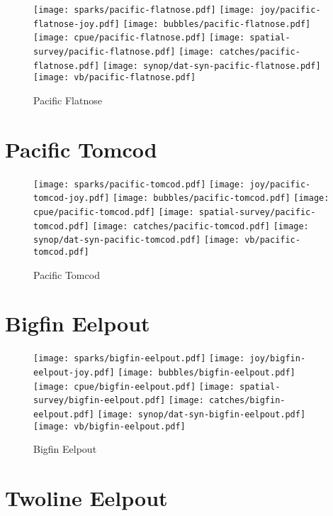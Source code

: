 \begin{figure}[htbp]
\centering
\texttt{[image: sparks/pacific-flatnose.pdf]}
\texttt{[image: joy/pacific-flatnose-joy.pdf]}
\texttt{[image: bubbles/pacific-flatnose.pdf]}
\texttt{[image: cpue/pacific-flatnose.pdf]}
\texttt{[image: spatial-survey/pacific-flatnose.pdf]}
\texttt{[image: catches/pacific-flatnose.pdf]}
\texttt{[image: synop/dat-syn-pacific-flatnose.pdf]}
\texttt{[image: vb/pacific-flatnose.pdf]}
\caption{Pacific Flatnose}
\end{figure}
\clearpage
\section{Pacific Tomcod}

\begin{figure}[htbp]
\centering
\texttt{[image: sparks/pacific-tomcod.pdf]}
\texttt{[image: joy/pacific-tomcod-joy.pdf]}
\texttt{[image: bubbles/pacific-tomcod.pdf]}
\texttt{[image: cpue/pacific-tomcod.pdf]}
\texttt{[image: spatial-survey/pacific-tomcod.pdf]}
\texttt{[image: catches/pacific-tomcod.pdf]}
\texttt{[image: synop/dat-syn-pacific-tomcod.pdf]}
\texttt{[image: vb/pacific-tomcod.pdf]}
\caption{Pacific Tomcod}
\end{figure}
\clearpage
\section{Bigfin Eelpout}

\begin{figure}[htbp]
\centering
\texttt{[image: sparks/bigfin-eelpout.pdf]}
\texttt{[image: joy/bigfin-eelpout-joy.pdf]}
\texttt{[image: bubbles/bigfin-eelpout.pdf]}
\texttt{[image: cpue/bigfin-eelpout.pdf]}
\texttt{[image: spatial-survey/bigfin-eelpout.pdf]}
\texttt{[image: catches/bigfin-eelpout.pdf]}
\texttt{[image: synop/dat-syn-bigfin-eelpout.pdf]}
\texttt{[image: vb/bigfin-eelpout.pdf]}
\caption{Bigfin Eelpout}
\end{figure}
\clearpage
\section{Twoline Eelpout}

